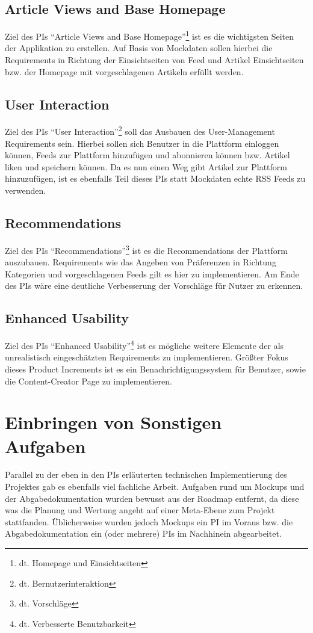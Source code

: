 \subsection{Article Views and Base Homepage}
Ziel des \ac{PI}s ``Article Views and Base Homepage''\footnote{dt. Homepage und Einsichtseiten} ist es die wichtigsten Seiten der Applikation zu erstellen.
Auf Basis von Mockdaten sollen hierbei die Requirements in Richtung der Einsichtseiten von Feed und Artikel Einsichtseiten bzw. der Homepage mit vorgeschlagenen Artikeln erfüllt werden.


\subsection{User Interaction}
Ziel des \ac{PI}s ``User Interaction''\footnote{dt. Bernutzerinteraktion} soll das Ausbauen des User-Management Requirements sein.
Hierbei sollen sich Benutzer in die Plattform einloggen können, Feeds zur Plattform hinzufügen und abonnieren können bzw. Artikel liken und speichern können.
Da es nun einen Weg gibt Artikel zur Plattform hinzuzufügen, ist es ebenfalls Teil dieses \ac{PI}s statt Mockdaten echte RSS Feeds zu verwenden.

\subsection{Recommendations}
Ziel des \ac{PI}s ``Recommendations''\footnote{dt. Vorschläge} ist es die Recommendations der Plattform auszubauen.
Requirements wie das Angeben von Präferenzen in Richtung Kategorien und vorgeschlagenen Feeds gilt es hier zu implementieren.
Am Ende des \ac{PI}s wäre eine deutliche Verbesserung der Vorschläge für Nutzer zu erkennen.

\subsection{Enhanced Usability}
Ziel des \ac{PI}s ``Enhanced Usability''\footnote{dt. Verbesserte Benutzbarkeit} ist es mögliche weitere Elemente der als unrealistisch eingeschätzten Requirements zu implementieren.
Größter Fokus dieses Product Increments ist es ein Benachrichtigungssystem für Benutzer, sowie die Content-Creator Page zu implementieren.

\section{Einbringen von Sonstigen Aufgaben}
Parallel zu der eben in den \ac{PI}s erläuterten technischen Implementierung des Projektes gab es ebenfalls viel fachliche Arbeit.
Aufgaben rund um Mockups und der Abgabedokumentation wurden bewusst aus der Roadmap entfernt, da diese was die Planung und Wertung angeht auf einer Meta-Ebene zum Projekt stattfanden.
Üblicherweise wurden jedoch Mockups ein \ac{PI} im Voraus bzw. die Abgabedokumentation ein (oder mehrere) \ac{PI}s im Nachhinein abgearbeitet.
